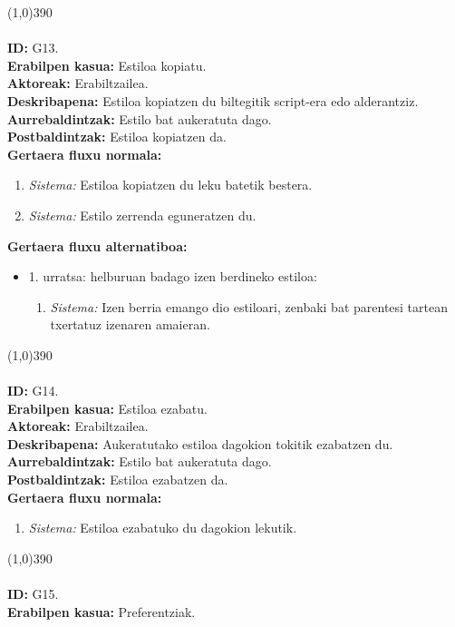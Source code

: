 \line(1,0){390}\\
\noindent\\
\textbf{ID:} G13.\\
\textbf{Erabilpen kasua:} Estiloa kopiatu.\\
\textbf{Aktoreak:} Erabiltzailea.\\
\textbf{Deskribapena:} Estiloa kopiatzen du biltegitik script-era edo alderantziz.\\
\textbf{Aurrebaldintzak:} Estilo bat aukeratuta dago.\\
\textbf{Postbaldintzak:} Estiloa kopiatzen da.\\
\textbf{Gertaera fluxu normala:}
\begin{enumerate}
	\item \textit{Sistema:} Estiloa kopiatzen du leku batetik bestera.
	\item \textit{Sistema:} Estilo zerrenda eguneratzen du.
\end{enumerate}
\textbf{Gertaera fluxu alternatiboa:}
\begin{itemize}
	\item 1. urratsa: helburuan badago izen berdineko estiloa:
		\begin{enumerate}
		\item \textit{Sistema:} Izen berria emango dio estiloari, zenbaki bat parentesi tartean txertatuz izenaren amaieran.
		\end{enumerate}
\end{itemize}
\line(1,0){390}\\
\noindent\\
\textbf{ID:} G14.\\
\textbf{Erabilpen kasua:} Estiloa ezabatu.\\
\textbf{Aktoreak:} Erabiltzailea.\\
\textbf{Deskribapena:} Aukeratutako estiloa dagokion tokitik ezabatzen du.\\
\textbf{Aurrebaldintzak:} Estilo bat aukeratuta dago.\\
\textbf{Postbaldintzak:} Estiloa ezabatzen da.\\
\textbf{Gertaera fluxu normala:}
\begin{enumerate}
	\item \textit{Sistema:} Estiloa ezabatuko du dagokion lekutik.
\end{enumerate}
\line(1,0){390}\\
\noindent\\
\textbf{ID:} G15.\\
\textbf{Erabilpen kasua:} Preferentziak.\\
